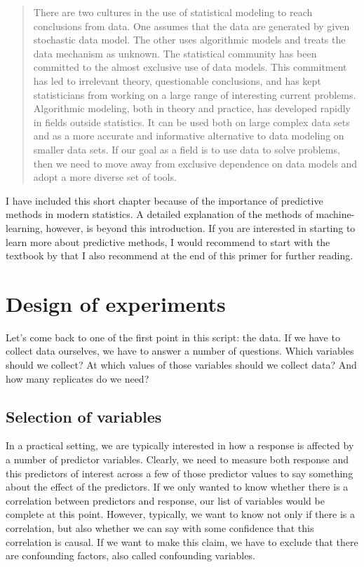 \documentclass[a4paper,twoside]{tufte-book}\usepackage[]{graphicx}\usepackage[]{color}
\begin{document}
\begin{quote}
There are two cultures in the use of statistical modeling to reach conclusions from data. One assumes that the data are generated by given stochastic data model. The other uses algorithmic models and treats the data mechanism as unknown. The statistical community has been committed to the almost exclusive use of data models. This commitment has led to irrelevant theory, questionable conclusions, and has kept statisticians from working on a large range of interesting current problems. Algorithmic modeling, both in theory and practice, has developed rapidly in fields outside statistics. It can be used both on large complex data sets and as a more accurate and informative alternative to data modeling on smaller data sets. If our goal as a field is to use data to solve problems, then we need to move away from exclusive dependence on data models and adopt a more diverse set of tools.
\end{quote}


I have included this short chapter because of the importance of predictive methods in modern statistics. A detailed explanation of the methods of machine-learning, however, is beyond this introduction. If you are interested in starting to learn more about predictive methods, I would recommend to start with the textbook by  \citet{James-IntroductiontoStatistical-2013} that I also recommend at the end of this primer for further reading. 

\chapter{Design of experiments}\label{cha: design of experiments}

Let's come back to one of the first point in this script: the data. If we have to collect data ourselves, we have to answer a number of questions. Which variables should we collect? At which values of those variables should we collect data? And how many replicates do we need?


\section{Selection of variables}

In a practical setting, we are typically interested in how a response is affected by a number of predictor variables. Clearly, we need to measure both response and this predictors of interest across a few of those predictor values to say something about the effect of the predictors.  If we only wanted to know whether there is a correlation between predictors and response, our list of variables would be complete at this point. However, typically, we want to know not only if there is a correlation, but also whether we can say with some confidence that this correlation is causal. If we want to make this claim, we have to exclude that there are confounding factors, also called confounding variables. 
\end{document}
